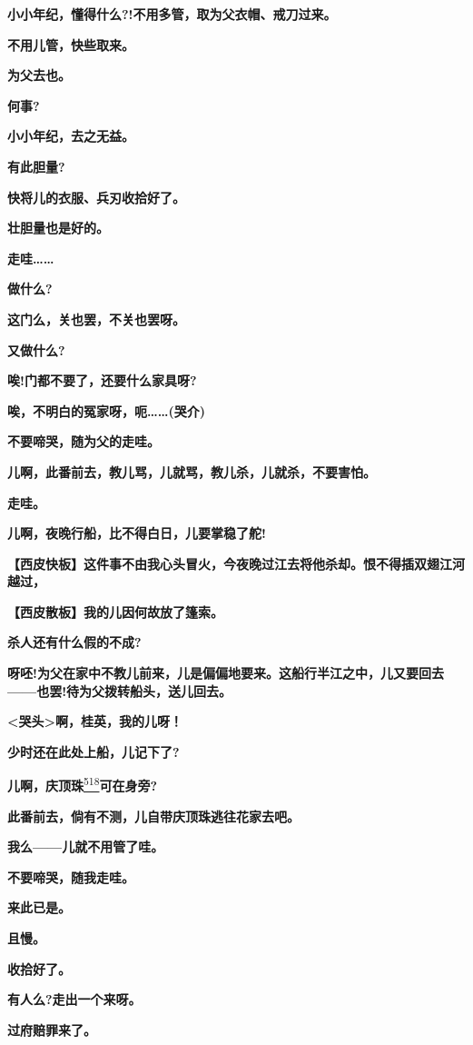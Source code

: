 \textbf{小小年纪，懂得什么?!不用多管，取为父衣帽、戒刀过来。}

\textbf{不用儿管，快些取来。}

\textbf{为父去也。}

\textbf{何事?}

\textbf{小小年纪，去之无益。}

\textbf{有此胆量?}

\textbf{快将儿的衣服、兵刃收拾好了。}

\textbf{壮胆量也是好的。}

\textbf{走哇\ldots{}\ldots{}}

\textbf{做什么?}

\textbf{这门么，关也罢，不关也罢呀。}

\textbf{又做什么?}

\textbf{唉!门都不要了，还要什么家具呀?}

\textbf{唉，不明白的冤家呀，呃\ldots{}\ldots{}(哭介)}

\textbf{不要啼哭，随为父的走哇。}

\textbf{儿啊，此番前去，教儿骂，儿就骂，教儿杀，儿就杀，不要害怕。}

\textbf{走哇。}

\textbf{儿啊，夜晚行船，比不得白日，儿要掌稳了舵!}

\textbf{【西皮快板】这件事不由我心头冒火，今夜晚过江去将他杀却。恨不得插双翅江河越过，}

\textbf{【西皮散板】我的儿因何故放了篷索。}

\textbf{杀人还有什么假的不成?}

\textbf{呀呸!为父在家中不教儿前来，儿是偏偏地要来。这船行半江之中，儿又要回去------也罢!待为父拨转船头，送儿回去。}

\textbf{\textless{}哭头\textgreater{}啊，桂英，我的儿呀！}

\textbf{少时还在此处上船，儿记下了?}

\textbf{儿啊，庆顶珠}\protect\hyperlink{fn518}{\textsuperscript{518}}\textbf{可在身旁?}

\textbf{此番前去，倘有不测，儿自带庆顶珠逃往花家去吧。}

\textbf{我么------儿就不用管了哇。}

\textbf{不要啼哭，随我走哇。}

\textbf{来此已是。}

\textbf{且慢。}

\textbf{收拾好了。}

\textbf{有人么?走出一个来呀。}

\textbf{过府赔罪来了。}

